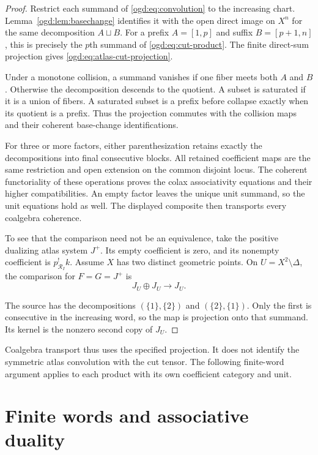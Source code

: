 \begin{proof}
Restrict each summand of \eqref{ogd:eq:convolution} to the increasing
chart. Lemma~\ref{ogd:lem:basechange} identifies it with the open
direct image on $X^n$ for the same decomposition $A\sqcup B$.
For a prefix $A=[1,p]$ and suffix $B=[p+1,n]$, this is precisely
the $p$th summand of \eqref{ogd:eq:cut-product}.
The finite direct-sum projection gives \eqref{ogd:eq:atlas-cut-projection}.

Under a monotone collision, a summand vanishes if one fiber meets
both $A$ and $B$. Otherwise the decomposition descends to the quotient.
A subset is saturated if it is a union of fibers.
A saturated subset is a prefix before collapse exactly when its
quotient is a prefix. Thus the projection commutes with the collision
maps and their coherent base-change identifications.

For three or more factors, either parenthesization retains exactly
the decompositions into final consecutive blocks.
All retained coefficient maps are the same restriction and open
extension on the common disjoint locus.
The coherent functoriality of these operations proves the colax
associativity equations and their higher compatibilities.
An empty factor leaves the unique unit summand, so the unit equations
hold as well. The displayed composite then transports every
coalgebra coherence.

To see that the comparison need not be an equivalence, take the
positive dualizing atlas system $J^+$.
Its empty coefficient is zero, and its nonempty coefficient is
$p_{\mathscr R_I}^!k$.
Assume $X$ has two distinct geometric points.
On $U=X^2\setminus\Delta$, the comparison for $F=G=J^+$ is
\[
 J_U\oplus J_U\longrightarrow J_U.
\]

The source has the decompositions $(\{1\},\{2\})$ and
$(\{2\},\{1\})$. Only the first is consecutive in the increasing
word, so the map is projection onto that summand.
Its kernel is the nonzero second copy of $J_U$.
\end{proof}



Coalgebra transport thus uses the specified projection.
It does not identify the symmetric atlas convolution with the cut
tensor. The following finite-word argument applies to each product
with its own coefficient category and unit.
\section{Finite words and associative duality}\label{ogd:sec:duality}

